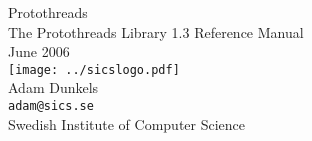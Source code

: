 \documentclass[a4paper]{article}
\begin{document}
\begin{titlepage}
\vspace*{5cm}
\begin{center}
{\Huge Protothreads}\\
\vspace*{1cm}
{\LARGE The Protothreads Library 1.3 Reference Manual}\\
\vspace*{3cm}
{\Large June 2006}\\
\vspace*{2cm}
\texttt{[image: ../sicslogo.pdf]}\\
\vspace*{1cm}
{\Large Adam Dunkels}\\
{\Large \texttt{adam@sics.se}}\\
\vspace*{1cm}
{\LARGE Swedish Institute of Computer Science}\\
\vspace*{0.5cm}

\end{center}
\end{titlepage}
\tableofcontents
{}
\end{document}
